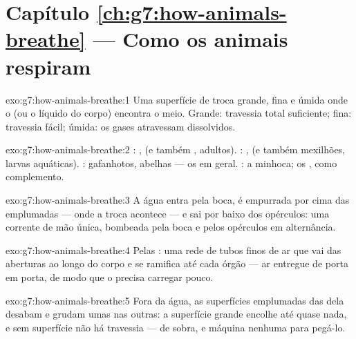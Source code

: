 \section*{Capítulo \ref{ch:g7:how-animals-breathe} --- Como os animais respiram}

\begin{solution}{exo:g7:how-animals-breathe:1}
Uma superfície de troca grande, fina e úmida onde o  (ou o
líquido do corpo) encontra o meio. Grande: travessia total suficiente;
fina: travessia fácil; úmida: os gases atravessam dissolvidos.
\end{solution}

\begin{solution}{exo:g7:how-animals-breathe:2}
: ,  (e também ,  adultos).
: ,  (e também mexilhões, larvas aquáticas).
: gafanhotos, abelhas --- os  em geral. : a minhoca; os , como complemento.
\end{solution}

\begin{solution}{exo:g7:how-animals-breathe:3}
A água entra pela boca, é empurrada por cima das  emplumadas
--- onde a troca acontece --- e sai por baixo dos opérculos: uma
corrente de mão única, bombeada pela boca e pelos opérculos em
alternância.
\end{solution}

\begin{solution}{exo:g7:how-animals-breathe:4}
Pelas : uma rede de tubos finos de ar que vai das aberturas
ao longo do corpo e se ramifica até cada órgão --- ar entregue de porta
em porta, de modo que o  precisa carregar pouco.
\end{solution}

\begin{solution}{exo:g7:how-animals-breathe:5}
Fora da água, as superfícies emplumadas das  dela desabam e
grudam umas nas outras: a superfície grande encolhe até quase nada, e
sem superfície não há travessia ---  de sobra, e máquina
nenhuma para pegá-lo.
\end{solution}

